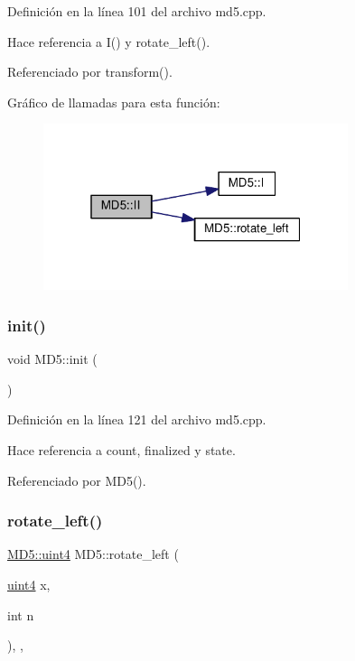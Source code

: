 Definición en la línea 101 del archivo md5.\+cpp.



Hace referencia a I() y rotate\+\_\+left().



Referenciado por transform().

Gráfico de llamadas para esta función\+:\nopagebreak
\begin{figure}[H]
\begin{center}
\leavevmode
\includegraphics[width=253pt]{classMD5_a7af0184654644964ecdb57b1203e5ec7_cgraph}
\end{center}
\end{figure}
\hypertarget{classMD5_a65ddaecdd0bd0b09043a2f3b2601bc2e}{}\label{classMD5_a65ddaecdd0bd0b09043a2f3b2601bc2e} 
\subsubsection{\texorpdfstring{init()}{init()}}
{\footnotesize\ttfamily void M\+D5\+::init (\begin{DoxyParamCaption}{ }\end{DoxyParamCaption})\hspace{0.3cm}{\ttfamily [private]}}



Definición en la línea 121 del archivo md5.\+cpp.



Hace referencia a count, finalized y state.



Referenciado por M\+D5().

\hypertarget{classMD5_a97ece3d8221e3c9c994aa9d13001b1d9}{}\label{classMD5_a97ece3d8221e3c9c994aa9d13001b1d9} 
\subsubsection{\texorpdfstring{rotate\+\_\+left()}{rotate\_left()}}
{\footnotesize\ttfamily \hyperlink{classMD5_a2e5b84a3d7db292f49873061214a0444}{M\+D5\+::uint4} M\+D5\+::rotate\+\_\+left (\begin{DoxyParamCaption}\item[{\hyperlink{classMD5_a2e5b84a3d7db292f49873061214a0444}{uint4}}]{x,  }\item[{int}]{n }\end{DoxyParamCaption})\hspace{0.3cm}{\ttfamily [inline]}, {\ttfamily [static]}, {\ttfamily [private]}}



